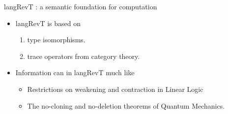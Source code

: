 \documentclass[svgnames,11pt]{beamer}
\newcommand{\red}[1]{{\color{red}{#1}}}
\begin{document}
\begin{frame}{ {{langRevT}} : a semantic foundation for computation}
  
\vfill
  \begin{itemize}

  \item {{langRevT}} is based on 

    \begin{enumerate}
    \item type isomorphisms.
    \item trace operators from category theory.
    \end{enumerate}

\pause
\vfill
  \item Information can \red{neither be created nor deleted} in {{langRevT}}
    much like

    \begin{itemize}
    \item Restrictions on weakening and contraction in Linear Logic 
    \item The no-cloning and no-deletion theorems of Quantum
      Mechanics.
    \end{itemize}

\vfill


      



 \end{itemize}



\end{frame}
\end{document}
